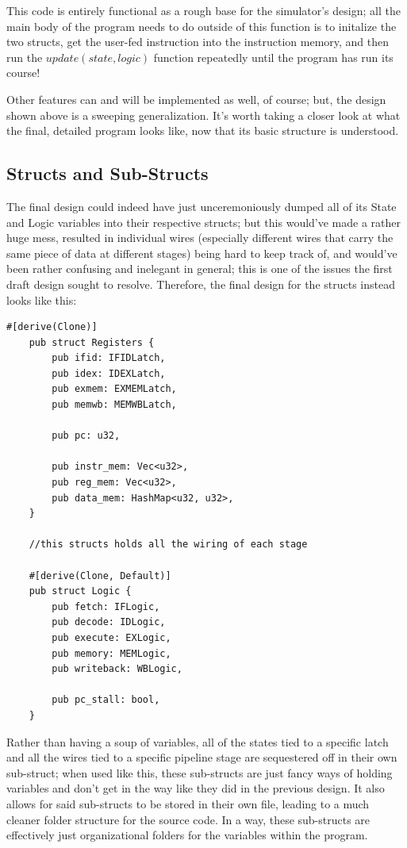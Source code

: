 \documentclass[12pt,twoside]{reedthesis}
\begin{document}
This code is entirely functional as a rough base for the simulator's design; all the main body of the program needs to do outside of this function is to initalize the two structs, get the user-fed instruction into the instruction memory, and then run the $update(state, logic)$ function repeatedly until the program has run its course!

Other features can and will be implemented as well, of course; but, the design shown above is a sweeping generalization. It's worth taking a closer look at what the final, detailed program looks like, now that its basic structure is understood.

\subsection{Structs and Sub-Structs}

The final design could indeed have just unceremoniously dumped all of its State and Logic variables into their respective structs; but this would've made a rather huge mess, resulted in individual wires (especially different wires that carry the same piece of data at different stages) being hard to keep track of, and would've been rather confusing and inelegant in general; this is one of the issues the first draft design sought to resolve. Therefore, the final design for the structs instead looks like this:

\begin{lstlisting}[caption={Snippet of $components.rs$, holds main 2 structs}]
	#[derive(Clone)]
	pub struct Registers {
		pub ifid: IFIDLatch,
		pub idex: IDEXLatch,
		pub exmem: EXMEMLatch,
		pub memwb: MEMWBLatch,

		pub pc: u32,

		pub instr_mem: Vec<u32>,
		pub reg_mem: Vec<u32>,
		pub data_mem: HashMap<u32, u32>,
	}

	//this structs holds all the wiring of each stage

	#[derive(Clone, Default)]
	pub struct Logic {
		pub fetch: IFLogic,
		pub decode: IDLogic,
		pub execute: EXLogic,
		pub memory: MEMLogic,
		pub writeback: WBLogic,

		pub pc_stall: bool,
	}
\end{lstlisting}

Rather than having a soup of variables, all of the states tied to a specific latch and all the wires tied to a specific pipeline stage are sequestered off in their own sub-struct; when used like this, these sub-structs are just fancy ways of holding variables and don't get in the way like they did in the previous design. It also allows for said sub-structs to be stored in their own file, leading to a much cleaner folder structure for the source code. In a way, these sub-structs are effectively just organizational folders for the variables within the program.
\end{document}
